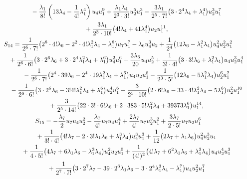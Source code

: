 \documentclass[pdftex]{sigma}
\numberwithin{equation}{section}
\begin{document}
\begin{gather*}
 \hphantom{S_{13} =}{}
 - \frac{\lambda_1}{8!} \left(13 \lambda_4 - \frac{1}{4!}\lambda_1^4\right) u_4 u_1^9 + \frac{\lambda_1 \lambda_4}{2^3 \cdot 3!} u_2^5 u_1^3
 - \frac{3 \lambda_1}{2^5\cdot 7!} \big(3\cdot 2^4 \lambda_4 + \lambda_1^4\big) u_2^3 u_1^7\\
\hphantom{S_{13} =}{} + \frac{3 \lambda_1}{2^3\cdot 10!}\big(4! \lambda_4 + 41 \lambda_1^4\big) u_2 u_1^{11},\\
 S_{14} = \frac{1}{2^6\cdot 7!} \big(2^6\cdot 4! \lambda_6 - 2^2\cdot 4! \lambda_1^2 \lambda_4
 - \lambda_1^6 \big) u_7 u_1^7 - \lambda_6 u_4^3 u_2 + \frac{1}{2^4} \big(12 \lambda_6 - \lambda_1^2 \lambda_4 \big) u_4^2 u_2^2 u_1^2 \\
\hphantom{S_{14} =}{} + \frac{1}{2^6\cdot 6!}\big( 3\cdot 2^6 \lambda_6 + 3\cdot 2^4\lambda_1^2 \lambda_4
 + \lambda_1^6 \big) u_4^2 u_1^6 + \frac{3\lambda_6}{20} u_4 u_2^5
 + \frac{1}{3!\cdot 4!}\big(3\cdot 3!\lambda_6 + \lambda_1^2 \lambda_4\big) u_4 u_2^3 u_1^4\\
 \hphantom{S_{14} =}{} - \frac{1}{2^6\cdot 7!} \big(2^4 \cdot 39 \lambda_6 - 2^4 \cdot 19 \lambda_1^2 \lambda_4 +
 \lambda_1^6 \big) u_4 u_2 u_1^8 - \frac{1}{2^3\cdot 5!} \big(12\lambda_6 - 5\lambda_1^2 \lambda_4 \big) u_2^6 u_1^2 \\
\hphantom{S_{14} =}{} - \frac{1}{2^8\cdot 6!} \big(3\cdot 2^6 \lambda_6 - 3! 4! \lambda_1^2 \lambda_4 + \lambda_1^6 \big) u_2^4 u_1^6
 + \frac{3}{2^5\cdot 10!} \big( 2\cdot 6! \lambda_6 - 33\cdot 4! \lambda_1^2 \lambda_4 - 5 \lambda_1^6 \big) u_2^2 u_1^{10} \\
 \hphantom{S_{14} =}{} + \frac{3}{2^5\cdot 14!} \big(22 \cdot 3! \cdot 6! \lambda_6 + 2\cdot 383 \cdot 5! \lambda_1^2 \lambda_4
 + 39373\lambda_1^6\big) u_1^{14},\\
 S_{15} = -\frac{\lambda_7}{2} u_7 u_4 u_2^2 - \frac{\lambda_7}{4!} u_7 u_4 u_1^4 +\frac{2\lambda_7}{4!} u_7 u_2^3 u_1^2 + \frac{3\lambda_7}{2\cdot 5!} u_7 u_2 u_1^6\\
 \hphantom{S_{15} =}{} + \frac{1}{3! \cdot 4!} \big(4! \lambda_7 - 2 \cdot 3! \lambda_1\lambda_6 + \lambda_1^3 \lambda_4 \big) u_4^3 u_1^3
 + \frac{1}{12} \big(2 \lambda_7 + \lambda_1\lambda_6 \big) u_4^2 u_2^3 u_1\\
 \hphantom{S_{15} =}{} + \frac{1}{4 \cdot 5!}\big( 4 \lambda_7 + 6\lambda_1\lambda_6 - \lambda_1^3 \lambda_4 \big) u_4^2 u_2 u_1^5
 + \frac{1}{(4!)^2} \big(4! \lambda_7 + 6^2 \lambda_1 \lambda_6 + \lambda_1^3 \lambda_4\big) u_4 u_2^4 u_1^3\\
 \hphantom{S_{15} =}{} + \frac{1}{2^7 \cdot 7!} \big(3 \cdot 2^7 \lambda_7 - 39 \cdot 2^6 \lambda_1\lambda_6 - 3 \cdot 2^4 \lambda_1^3 \lambda_4 - \lambda_1^7 \big) u_4 u_2^2 u_1^7\\

\end{gather*}
\end{document}
